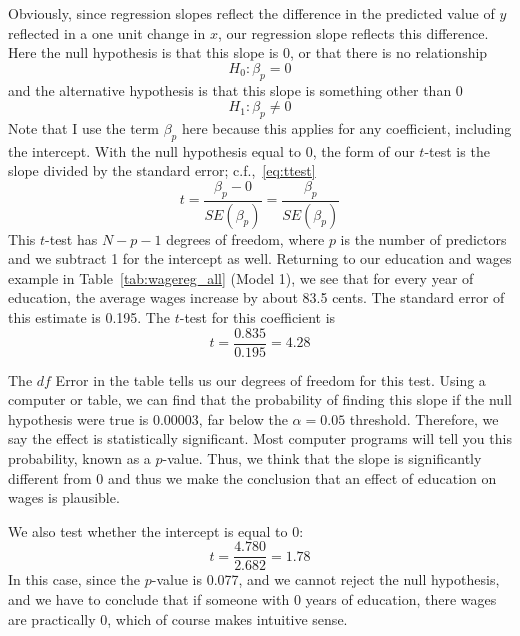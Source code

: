 Obviously, since regression slopes reflect the difference in the predicted value of $y$ reflected in a one unit change in $x$, our regression slope reflects this difference. Here the null hypothesis is that this slope is 0, or that there is no relationship
\begin{equation}
H_0:\beta_p = 0
\end{equation}
and the alternative hypothesis is that this slope is something other than 0
\begin{equation}
H_1:\beta_p \ne 0
\end{equation}
Note that I use the term $\beta_p$ here because this applies for any coefficient, including the intercept. With the null hypothesis equal to 0, the form of our $t$-test is the slope divided by the standard error; c.f.,~\eqref{eq:ttest}
\begin{equation}
t=\frac{\beta_p-0}{SE\left(\beta_p\right)}=\frac{\beta_p}{SE\left(\beta_p\right)}
\end{equation}
This $t$-test has $N-p-1$ degrees of freedom, where $p$ is the number of predictors and we subtract 1 for the intercept as well.
Returning to our education and wages example in Table~\ref{tab:wagereg_all} (Model 1), we see that for every year of education, the average wages increase by about 83.5 cents. The standard error of this estimate is 0.195. The $t$-test for this coefficient is
\[
t=\frac{0.835}{0.195}=4.28
\]

The $df$ Error in the table tells us our degrees of freedom for this test. Using a computer or table, we can find that the probability of finding this slope if the null hypothesis were true is 0.00003, far below the $\alpha = 0.05$ threshold. Therefore, we say the effect is statistically significant. Most computer programs will tell you this probability, known as a $p$-value. Thus, we think that the slope is significantly different from 0 and thus we make the conclusion that an effect of education on wages is plausible.

We also test whether the intercept is equal to 0:
\[
t=\frac{4.780}{2.682}=1.78
\]
In this case, since the $p$-value is 0.077, and we cannot reject the null hypothesis, and we have to conclude that if someone with 0 years of education, there wages are practically 0, which of course makes intuitive sense.

